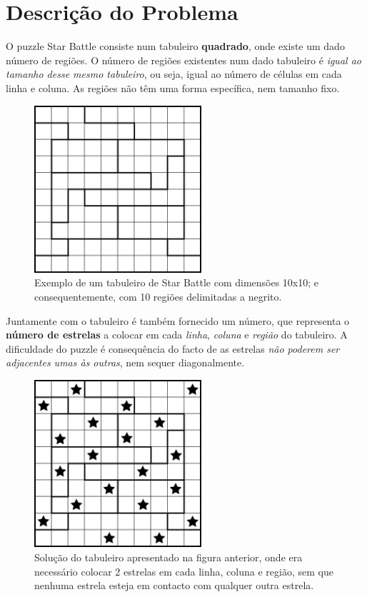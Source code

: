 \documentclass[runningheads,a4paper]{llncs}
\begin{document}
\section{Descrição do Problema}

O puzzle Star Battle consiste num tabuleiro \textbf{quadrado}, onde existe um dado número de regiões. O número de regiões existentes num dado tabuleiro é \textit{igual ao tamanho desse mesmo tabuleiro}, ou seja, igual ao número de células em cada linha e coluna. As regiões não têm uma forma específica, nem tamanho fixo. 

\begin{figure}
\centering
\includegraphics[height=6.2cm]{res/starBattleExample}
\caption{Exemplo de um tabuleiro de Star Battle com dimensões 10x10; e consequentemente, com 10 regiões delimitadas a negrito.}
\label{fig:example}
\end{figure}

Juntamente com o tabuleiro é também fornecido um número, que representa o \textbf{número de estrelas} a colocar em cada \textit{linha}, \textit{coluna} e \textit{região} do tabuleiro. A dificuldade do puzzle é consequência do facto de as estrelas \textit{não poderem ser adjacentes umas às outras}, nem sequer diagonalmente.

\begin{figure}
\centering
\includegraphics[height=6.2cm]{res/starBattleExampleSolution}
\caption{Solução do tabuleiro apresentado na figura anterior, onde era necessário colocar 2 estrelas em cada linha, coluna e região, sem que nenhuma estrela esteja em contacto com qualquer outra estrela.}
\label{fig:example}
\end{figure}
\end{document}

